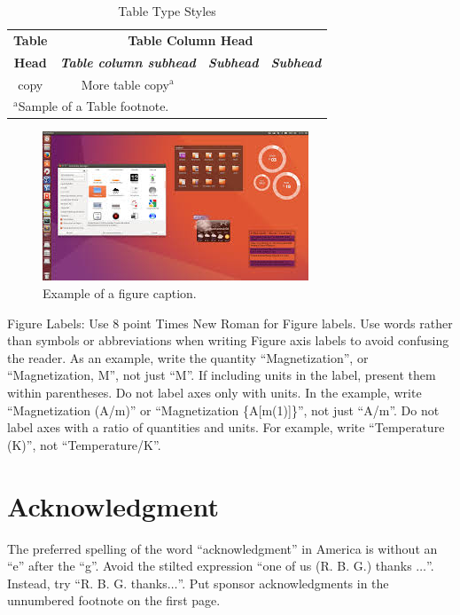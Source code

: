\documentclass[conference]{IEEEtran}
\begin{document}
\begin{table}[htbp]
\caption{Table Type Styles}
\begin{center}
\begin{tabular}{|c|c|c|c|}
\hline
\textbf{Table}&\multicolumn{3}{|c|}{\textbf{Table Column Head}} \\
\cline{2-4} 
\textbf{Head} & \textbf{\textit{Table column subhead}}& \textbf{\textit{Subhead}}& \textbf{\textit{Subhead}} \\
\hline
copy& More table copy$^{\mathrm{a}}$& &  \\
\hline
\multicolumn{4}{l}{$^{\mathrm{a}}$Sample of a Table footnote.}
\end{tabular}
\label{tab1}
\end{center}
\end{table}

\begin{figure}[htbp]
\begin{center}
\includegraphics[width= 0.45 \textwidth]{fig2.jpeg}
\end{center}
\caption{Example of a figure caption.}
\label{fig}
\end{figure}

Figure Labels: Use 8 point Times New Roman for Figure labels. Use words 
rather than symbols or abbreviations when writing Figure axis labels to 
avoid confusing the reader. As an example, write the quantity 
``Magnetization'', or ``Magnetization, M'', not just ``M''. If including 
units in the label, present them within parentheses. Do not label axes only 
with units. In the example, write ``Magnetization (A/m)'' or ``Magnetization 
\{A[m(1)]\}'', not just ``A/m''. Do not label axes with a ratio of 
quantities and units. For example, write ``Temperature (K)'', not 
``Temperature/K''.

\section*{Acknowledgment}

The preferred spelling of the word ``acknowledgment'' in America is without 
an ``e'' after the ``g''. Avoid the stilted expression ``one of us (R. B. 
G.) thanks $\ldots$''. Instead, try ``R. B. G. thanks$\ldots$''. Put sponsor 
acknowledgments in the unnumbered footnote on the first page.
\end{document}
